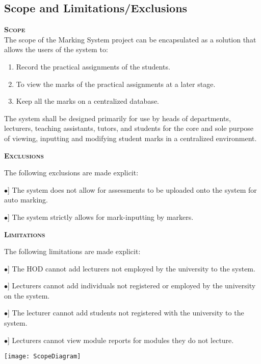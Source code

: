 \documentclass[12pt, a4paper]{scrartcl}
\newcommand{\tab}[1]{\hspace{.05\textwidth}\rlap{#1}}
\begin{document}
			\subsection{Scope and Limitations/Exclusions}
				\textsc{\bf Scope}\\
					The scope of the Marking System project can be encapsulated as a solution that allows the users of the system to:
					\begin{enumerate}
						\item Record the practical assignments of the students.
						\item To view the marks of the practical assignments at a later stage.
						\item Keep all the marks on a centralized database.
					\end{enumerate}
					The system shall be designed primarily for use by heads of departments, lecturers, teaching assistants, tutors, and students for the core and sole purpose of viewing, inputting and modifying student marks in a centralized environment.

				\textsc{\bf Exclusions}
					\begin{description}
						\item The following exclusions are made explicit:
						\begin{description}
							\item \tab [$\bullet$] The system does not allow for assessments to be uploaded onto the system for auto marking.
							\item \tab [$\bullet$] The system strictly allows for mark-inputting by markers.
						\end{description}
 					\end{description}
				\textsc{\bf Limitations}
					\begin{description}
						\item The following limitations are made explicit:
						\begin{description}	
							\item \tab [$\bullet$] The HOD cannot add lecturers not employed by the university to the system.	
							\item \tab [$\bullet$] Lecturers cannot add individuals not registered or employed by the university on the system.	
							\item \tab [$\bullet$] The lecturer cannot add students not registered with the university to the system.	
							\item \tab [$\bullet$] Lecturers cannot view module reports for modules they do not lecture.
						\end{description}
						\item \tab \textsc{\bf Use-Case Diagram}
                		\item \texttt{[image: ScopeDiagram]}
                	\end{description}
\end{document}
